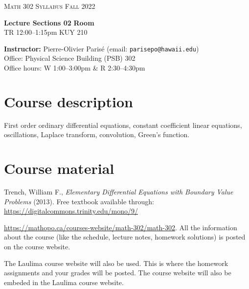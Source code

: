 \documentclass[12pt]{amsart}
\newcommand{\spacer}{\vspace{.2cm}}
\newcommand{\svs}{\vspace{.1cm}}
\begin{document}
\begin{center}
\textsc{Math 302} \hfill {\Large\textsc{Syllabus}} \hfill \textsc{Fall 2022}
\end{center}

\noindent\hrulefill

\noindent\textbf{Lecture Sections 02} \hfill \textbf{Room} \\
\noindent TR 12:00--1:15pm \hfill KUY 210

\noindent\hrulefill

\spacer

\noindent\textbf{Instructor:} Pierre-Olivier Paris{\'e} (email: \texttt{parisepo@hawaii.edu})\\
Office: Physical Science Building (PSB) 302\\
Office hours: W 1:00--3:00pm \& R 2:30--4:30pm

\noindent\hrulefill

\section*{Course description}
First order ordinary differential equations, constant coefficient linear equations, oscillations, Laplace transform, convolution, Green’s function.\svs

\section*{Course material}

 Trench, William F., \emph{Elementary Differential Equations with Boundary Value Problems} (2013). Free textbook available through: \url{https://digitalcommons.trinity.edu/mono/9/}  

 \url{https://mathopo.ca/courses-website/math-302/math-302}. All the information about the course (like the schedule, lecture notes, homework solutions) is posted on the course website.

 The Laulima course website will also be used. This is where the homework assignments and your grades will be posted. The course website will also be embeded in the Laulima course website.
\end{document}
